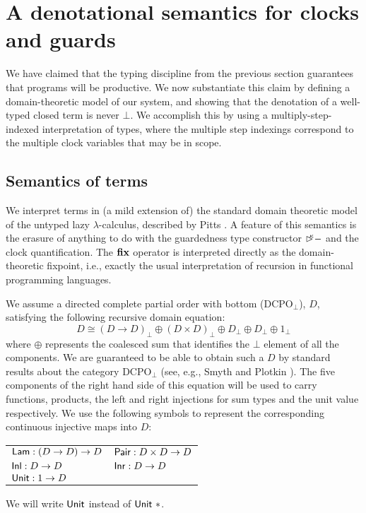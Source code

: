 \section{A denotational semantics for clocks and guards}
\label{sec:semantics}

We have claimed that the typing discipline from the previous section
guarantees that programs will be productive. We now substantiate this
claim by defining a domain-theoretic model of our system, and showing
that the denotation of a well-typed closed term is never $\bot$. We
accomplish this by using a multiply-step-indexed interpretation of
types, where the multiple step indexings correspond to the multiple
clock variables that may be in scope.

\subsection{Semantics of terms}
\label{sec:semantics-of-programs}

We interpret terms in (a mild extension of) the standard domain
theoretic model of the untyped lazy $\lambda$-calculus, described by
Pitts \cite{PittsAM:compavm}. A feature of this semantics is the
erasure of anything to do with the guardedness type constructor
$\mathord{\rhd\kern-0.4em^{\kappa}}-$ and the clock quantification. The $\textbf{fix}$ operator
is interpreted directly as the domain-theoretic fixpoint, i.e.,
exactly the usual interpretation of recursion in functional
programming languages.

We assume a directed complete partial order with bottom
($\mathrm{DCPO}_\bot$), $D$, satisfying the following recursive domain
equation:
\begin{displaymath}
  D \cong (D \to D)_\bot \oplus (D \times D)_\bot \oplus D_\bot \oplus D_\bot \oplus 1_\bot
\end{displaymath}
where $\oplus$ represents the coalesced sum that identifies the $\bot$
element of all the components. We are guaranteed to be able to obtain
such a $D$ by standard results about the category $\mathrm{DCPO}_\bot$
(see, e.g., Smyth and Plotkin \cite{smyth82category}). The five
components of the right hand side of this equation will be used to
carry functions, products, the left and right injections for sum types
and the unit value respectively. We use the following symbols to
represent the corresponding continuous injective maps into $D$:
\begin{center}
  \begin{tabular}{ll}
    $\mathsf{Lam} : (D \to D) \to D$ & $\mathsf{Pair} : D \times D \to D$ \\
    $\mathsf{Inl} : D \to D$ & $\mathsf{Inr} : D \to D$ \\
    $\mathsf{Unit} : 1 \to D$
  \end{tabular}  
\end{center}
We will write $\mathsf{Unit}$ instead of $\mathsf{Unit}\ *$.

